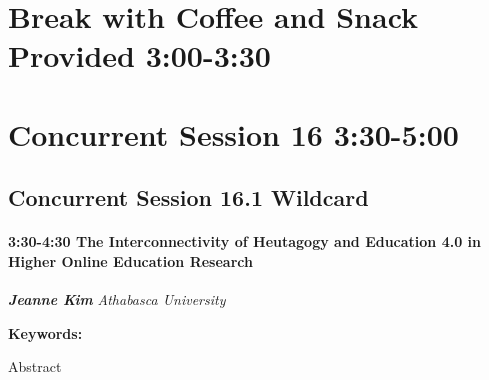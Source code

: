 \documentclass[
]{book}
\begin{document}
\hypertarget{break-with-coffee-and-snack-provided-300-330-2}{%
\section*{Break with Coffee and Snack Provided \textbar{} 3:00-3:30}\label{break-with-coffee-and-snack-provided-300-330-2}}

\hypertarget{concurrent-session-16-330-500}{%
\section*{Concurrent Session 16 \textbar{} 3:30-5:00}\label{concurrent-session-16-330-500}}

\hypertarget{concurrent-session-16.1-wildcard}{%
\subsection*{Concurrent Session 16.1 \textbar{} Wildcard}\label{concurrent-session-16.1-wildcard}}

\begin{session}
\hypertarget{the-interconnectivity-of-heutagogy-and-education-4.0-in-higher-online-education-research}{%
\paragraph*{\texorpdfstring{3:30-4:30 \textbar{} \textbf{The
Interconnectivity of Heutagogy and Education 4.0 in Higher Online
Education} \textbar{}
Research}{3:30-4:30 \textbar{} The Interconnectivity of Heutagogy and Education 4.0 in Higher Online Education \textbar{} Research}}\label{the-interconnectivity-of-heutagogy-and-education-4.0-in-higher-online-education-research}}

\textbf{\emph{Jeanne Kim}} \textbar{} \emph{Athabasca University}

\textbf{Keywords:}

Abstract
\end{session}
\end{document}
